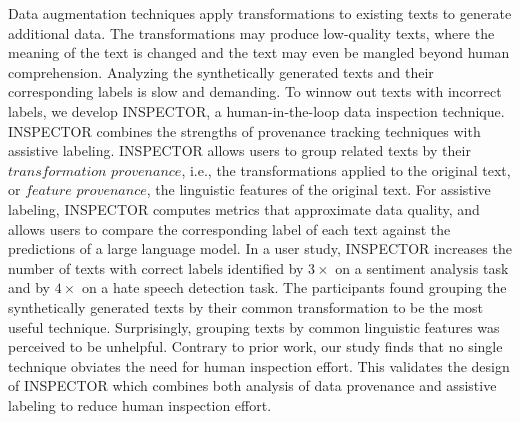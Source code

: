 Data augmentation techniques apply transformations to existing texts to generate additional data. The transformations may produce low-quality texts, where the meaning of the text is changed and the text may even be mangled beyond human comprehension. Analyzing the synthetically generated texts and their corresponding labels is slow and demanding. To winnow out texts with incorrect labels, we develop INSPECTOR, a human-in-the-loop data inspection technique. INSPECTOR combines the strengths of provenance tracking techniques with assistive labeling. INSPECTOR allows users to group related texts by their $\textit{transformation provenance}$, i.e., the transformations applied to the original text, or $\textit{feature provenance}$, the linguistic features of the original text. For assistive labeling, INSPECTOR computes metrics that approximate data quality, and allows users to compare the corresponding label of each text against the predictions of a large language model. In a user study, INSPECTOR increases the number of texts with correct labels identified by $3\times$ on a sentiment analysis task and by $4\times$ on a hate speech detection task. The participants found grouping the synthetically generated texts by their common transformation to be the most useful technique. Surprisingly, grouping texts by common linguistic features was perceived to be unhelpful. Contrary to prior work, our study finds that no single technique obviates the need for human inspection effort. This validates the design of INSPECTOR which combines both analysis of data provenance and assistive labeling to reduce human inspection effort.
